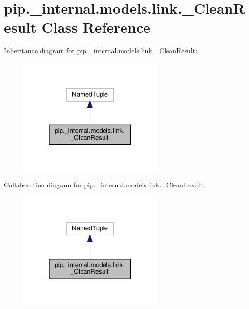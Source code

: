 \hypertarget{classpip_1_1__internal_1_1models_1_1link_1_1__CleanResult}{}\section{pip.\+\_\+internal.\+models.\+link.\+\_\+\+Clean\+Result Class Reference}
\label{classpip_1_1__internal_1_1models_1_1link_1_1__CleanResult}


Inheritance diagram for pip.\+\_\+internal.\+models.\+link.\+\_\+\+Clean\+Result\+:
\nopagebreak
\begin{figure}[H]
\begin{center}
\leavevmode
\includegraphics[width=205pt]{classpip_1_1__internal_1_1models_1_1link_1_1__CleanResult__inherit__graph}
\end{center}
\end{figure}


Collaboration diagram for pip.\+\_\+internal.\+models.\+link.\+\_\+\+Clean\+Result\+:
\nopagebreak
\begin{figure}[H]
\begin{center}
\leavevmode
\includegraphics[width=205pt]{classpip_1_1__internal_1_1models_1_1link_1_1__CleanResult__coll__graph}
\end{center}
\end{figure}


